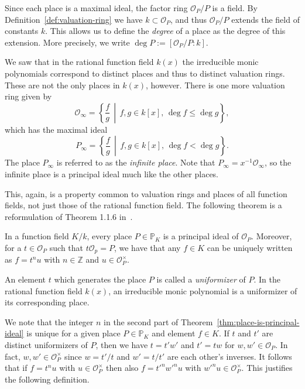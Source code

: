Since each place is a maximal ideal, the factor ring \(\mathcal{O}_{P} / P\) is a field. By Definition~\ref{def:valuation-ring} we have \(k \subset \mathcal{O}_{P}\), and thus \(\mathcal{O}_{P} / P\) extends the field of constants \(k\). This allows us to define the \textit{degree} of a place as the degree of this extension. More precisely, we write \(\deg{P} := [\mathcal{O}_{P} / P : k]\). %

We saw that in the rational function field \(k(x)\) the irreducible monic polynomials correspond to distinct places and thus to distinct valuation rings. These are not the only places in \(k(x)\), however. There is one more valuation ring given by
\[\mathcal{O}_{\infty} = \left\{ \frac{f}{g} \,\middle|\, f,g \in k[x] ,\, \deg{f} \leq \deg{g} \right\},\]
which has the maximal ideal
\[P_{\infty} = \left\{ \frac{f}{g} \,\middle|\, f,g \in k[x] ,\, \deg{f} < \deg{g} \right\}.\]
The place \(P_{\infty}\) is referred to as the \textit{infinite place}. Note that \(P_{\infty} = x^{-1}\mathcal{O}_{\infty}\), so the infinite place is a principal ideal much like the other places.

This, again, is a property common to valuation rings and places of all function fields, not just those of the rational function field. The following theorem is a reformulation of Theorem 1.1.6 in~\cite{stichtenoth-2009-algebraic-function-fields}.

\begin{theorem}%
  \label{thm:place-is-principal-ideal}
  In a function field \(K / k\), every place \(P \in \mathbb{P}_{K}\) is a principal ideal of \(\mathcal{O}_{P}\). Moreover, for a \(t \in \mathcal{O}_{P}\) such that \(t\mathcal{O}_{p} = P\), we have that any \(f \in K\) can be uniquely written as \(f = t^{n}u\) with \(n \in \mathbb{Z}\) and \(u \in \mathcal{O}_{P}^{\times}\).
\end{theorem}

An element \(t\) which generates the place \(P\) is called a \textit{uniformizer} of \(P\). In the rational function field \(k(x)\), an irreducible monic polynomial is a uniformizer of its corresponding place.

We note that the integer \(n\) in the second part of Theorem~\ref{thm:place-is-principal-ideal} is unique for a given place \(P \in \mathbb{P}_{K}\) and element \(f \in K\). If \(t\) and \(t'\) are distinct uniformizers of \(P\), then we have \(t = t'w'\) and \(t' = tw\) for \(w,w' \in \mathcal{O}_{P}\). In fact, \(w,w' \in \mathcal{O}_{P}^{\times}\) since \(w = t'/t\) and \(w' = t/t'\) are each other's inverses. It follows that if \(f = t^{n}u\) with \(u \in \mathcal{O}_{P}^{\times}\) then also \(f = {t'}^{n}{w'}^{n}u\) with \({w'}^{n}u \in \mathcal{O}_{P}^{\times}\). This justifies the following definition.

